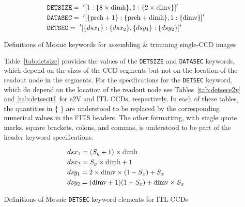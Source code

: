 \documentclass{article}[12pt]
\begin{document}
{\begin{table}
\begin{align*}
& {\tt DETSIZE} =~'[1: \{8 \times {\rm dimh}\}, 1: \{2 \times {\rm dimv}\}]' \\
& {\tt DATASEC} =~'[ \{{\rm preh} + 1\} : \{{\rm preh} + {\rm dimh}\}, 1 :  \{{\rm dimv}\}]' \\
& {\tt DETSEC} =~'[ \{dsx_1\} : \{dsx_2\}, \{dsy_1\}: \{dsy_2\}]' \\
\end{align*}
\caption{Definitions of Mosaic keywords for assembling \& trimming single-CCD images\label{tab:detsize}}
\end{table}

Table~\ref{tab:detsize} provides the values of the {\tt DETSIZE} and {\tt DATASEC} keywords, which depend on the sizes of the CCD segments but not on the location of the readout node in the segments.  For the specifications for the {\tt DETSEC} keyword, which do depend on the location of the readout node see Tables~\ref{tab:detsece2v} and \ref{tab:detsecitl} for e2V and ITL CCDs, respectively.  In each of these tables, the quantities in \{ \} are understood to be replaced by the corresponding numerical values in the FITS headers.  The other formatting, with single quote marks, square brackets, colons, and commas, is understood to be part of the header keyword specifications.

\begin{table}
\begin{align*}
& dsx_1 = (S_y +1) \times {\rm dimh}  \\
& dsx_2 = S_y \times {\rm dimh} + 1 \\
& dsy_1 = 2 \times {\rm dimv} \times (1 - S_x) +  S_x \\
& dsy_2 = ({\rm dimv} + 1)(1 - S_x) + {\rm dimv}  \times S_x \\ 
\end{align*}
\caption{Definitions of Mosaic {\tt DETSEC} keyword elements for ITL CCDs\label{tab:detsecitl}}
\end{table}

%    


}
\end{document}
